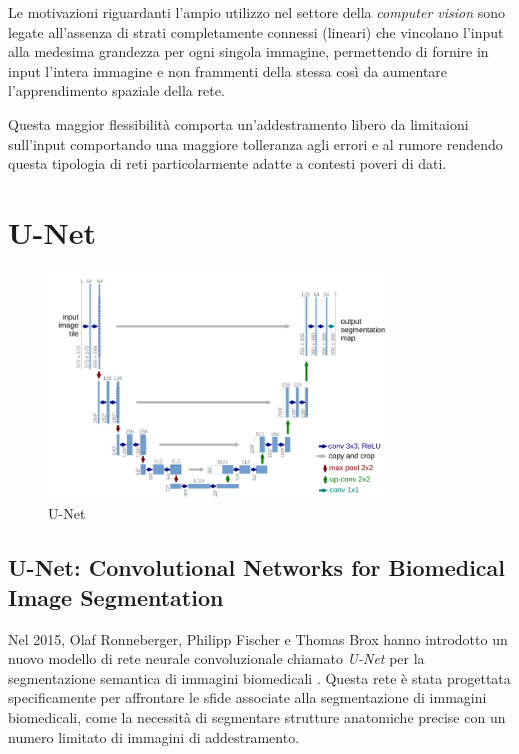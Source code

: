 Le motivazioni riguardanti l'ampio utilizzo nel settore della
\textit{computer vision} sono legate all'assenza di strati completamente
connessi (lineari) che vincolano l'input alla medesima grandezza per ogni
singola immagine, permettendo di fornire in input l'intera immagine e non
frammenti della stessa così da aumentare l'apprendimento spaziale della rete.

Questa maggior flessibilità comporta un'addestramento libero da limitaioni
sull'input comportando una maggiore tolleranza agli errori e al rumore
rendendo questa tipologia di reti particolarmente adatte a contesti poveri di
dati.




\section{U-Net} \label{sec:unet} 

\begin{figure}[H]
  \begin{center}
    \includegraphics[width=0.8\textwidth]{Immagini/unet.png}
  \end{center}
  \caption{U-Net}\label{fig:unet}
\end{figure}


\subsection{U-Net: Convolutional Networks for Biomedical Image Segmentation}

Nel 2015, Olaf Ronneberger, Philipp Fischer e Thomas Brox hanno introdotto un
nuovo modello di rete neurale convoluzionale chiamato \textit{U-Net} per la
segmentazione semantica di immagini biomedicali \cite{ronneberger2015unet}.
Questa rete è stata progettata specificamente per affrontare le sfide associate
alla segmentazione di immagini biomedicali, come la necessità di segmentare
strutture anatomiche precise con un numero limitato di immagini di
addestramento.

